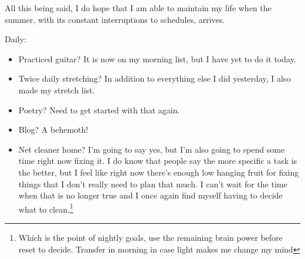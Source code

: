 \documentclass[12pt]{article}[titlepage]
\renewcommand{\,}{\textsuperscript{,}}
\begin{document}
All this being said, I do hope that I am able to maintain my life when the summer, with its constant interruptions to schedules, arrives.  


Daily:  
\begin{itemize}  
\item Practiced guitar? It is now on my morning list, but I have yet to do it today.  
\item Twice daily stretching? In addition to everything else I did yesterday, I also made my stretch list.  
\item Poetry? Need to get started with that again.  
\item Blog? A behemoth!  
\item Net cleaner home? I'm going to say yes, but I'm also going to spend some time right now fixing it. I do know that people say the more specific a task is the better, but I feel like right now there's enough low hanging fruit for fixing things that I don't really need to plan that much. I can't wait for the time when that is no longer true and I once again find myself having to decide what to clean.\footnote{Which is the point of nightly goals, use the remaining brain power before reset to decide. Transfer in morning in case light makes me change my mind}  
\end{itemize}
\end{document}
